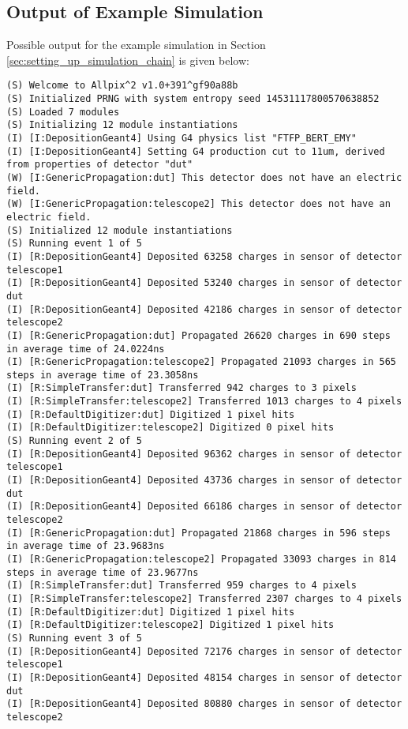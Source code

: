 \subsection{Output of Example Simulation}
\label{sec:example_output}
Possible output for the example simulation in Section \ref{sec:setting_up_simulation_chain} is given below:

\begin{lstlisting}[breaklines]
(S) Welcome to Allpix^2 v1.0+391^gf90a88b
(S) Initialized PRNG with system entropy seed 14531117800570638852
(S) Loaded 7 modules
(S) Initializing 12 module instantiations
(I) [I:DepositionGeant4] Using G4 physics list "FTFP_BERT_EMY"
(I) [I:DepositionGeant4] Setting G4 production cut to 11um, derived from properties of detector "dut"
(W) [I:GenericPropagation:dut] This detector does not have an electric field.
(W) [I:GenericPropagation:telescope2] This detector does not have an electric field.
(S) Initialized 12 module instantiations
(S) Running event 1 of 5
(I) [R:DepositionGeant4] Deposited 63258 charges in sensor of detector telescope1
(I) [R:DepositionGeant4] Deposited 53240 charges in sensor of detector dut
(I) [R:DepositionGeant4] Deposited 42186 charges in sensor of detector telescope2
(I) [R:GenericPropagation:dut] Propagated 26620 charges in 690 steps in average time of 24.0224ns
(I) [R:GenericPropagation:telescope2] Propagated 21093 charges in 565 steps in average time of 23.3058ns
(I) [R:SimpleTransfer:dut] Transferred 942 charges to 3 pixels
(I) [R:SimpleTransfer:telescope2] Transferred 1013 charges to 4 pixels
(I) [R:DefaultDigitizer:dut] Digitized 1 pixel hits
(I) [R:DefaultDigitizer:telescope2] Digitized 0 pixel hits
(S) Running event 2 of 5
(I) [R:DepositionGeant4] Deposited 96362 charges in sensor of detector telescope1
(I) [R:DepositionGeant4] Deposited 43736 charges in sensor of detector dut
(I) [R:DepositionGeant4] Deposited 66186 charges in sensor of detector telescope2
(I) [R:GenericPropagation:dut] Propagated 21868 charges in 596 steps in average time of 23.9683ns
(I) [R:GenericPropagation:telescope2] Propagated 33093 charges in 814 steps in average time of 23.9677ns
(I) [R:SimpleTransfer:dut] Transferred 959 charges to 4 pixels
(I) [R:SimpleTransfer:telescope2] Transferred 2307 charges to 4 pixels
(I) [R:DefaultDigitizer:dut] Digitized 1 pixel hits
(I) [R:DefaultDigitizer:telescope2] Digitized 1 pixel hits
(S) Running event 3 of 5
(I) [R:DepositionGeant4] Deposited 72176 charges in sensor of detector telescope1
(I) [R:DepositionGeant4] Deposited 48154 charges in sensor of detector dut
(I) [R:DepositionGeant4] Deposited 80880 charges in sensor of detector telescope2

\end{lstlisting}
